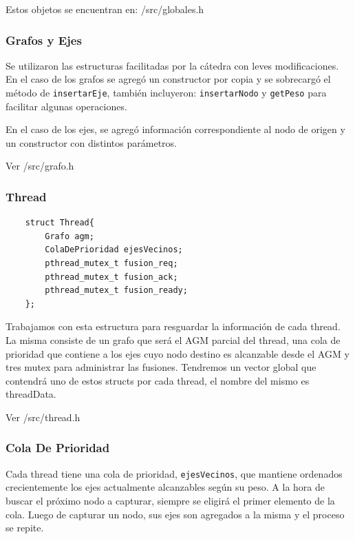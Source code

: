 Estos objetos se encuentran en: \textmd{/src/globales.h}

\subsubsection{Grafos y Ejes}

Se utilizaron las estructuras facilitadas por la cátedra con leves modificaciones. En el caso de los grafos se agregó un constructor por copia y se sobrecargó el método de \texttt{insertarEje}, también incluyeron: \texttt{insertarNodo} y \texttt{getPeso} para facilitar algunas operaciones.

En el caso de los ejes, se agregó información correspondiente al nodo de origen y un constructor con distintos parámetros.

Ver \textmd{/src/grafo.h}

\newpage

\subsubsection{Thread}

\begin{verbatim}
    struct Thread{
        Grafo agm;
        ColaDePrioridad ejesVecinos;
        pthread_mutex_t fusion_req;
        pthread_mutex_t fusion_ack;
        pthread_mutex_t fusion_ready;
    };
\end{verbatim}

Trabajamos con esta estructura para resguardar la información de cada thread. La misma consiste de un grafo que será el AGM parcial del thread, una cola de prioridad que contiene a los ejes cuyo nodo destino es alcanzable desde el AGM y tres mutex para administrar las fusiones. Tendremos un vector global que contendrá uno de estos structs por cada thread, el nombre del mismo es threadData.

Ver \textmd{/src/thread.h}

\subsubsection{Cola De Prioridad}

Cada thread tiene una cola de prioridad, \texttt{ejesVecinos}, que mantiene ordenados crecientemente los ejes actualmente alcanzables según su peso. A la hora de buscar el próximo nodo a capturar, siempre se eligirá el primer elemento de la cola. Luego de capturar un nodo, sus ejes son agregados a la misma y el proceso se repite.

